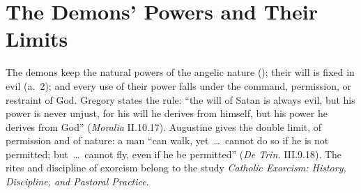 \section{The Demons' Powers and Their Limits}\label{app:demons}

The demons keep the natural powers of the angelic nature (); their will is fixed in evil (a.~2); and every use of their power
falls under the command, permission, or restraint of God. Gregory states the
rule: ``the will of Satan is always evil, but his power is never unjust, for
his will he derives from himself, but his power he derives from God''
(\emph{Moralia} II.10.17). Augustine gives the double limit, of permission
and of nature: a man ``can walk, yet~\dots\ cannot do so if he is not
permitted; but~\dots\ cannot fly, even if he be permitted'' (\emph{De Trin.}
III.9.18). The rites and discipline of exorcism belong to the study \emph{Catholic Exorcism: History, Discipline, and
Pastoral Practice}.

